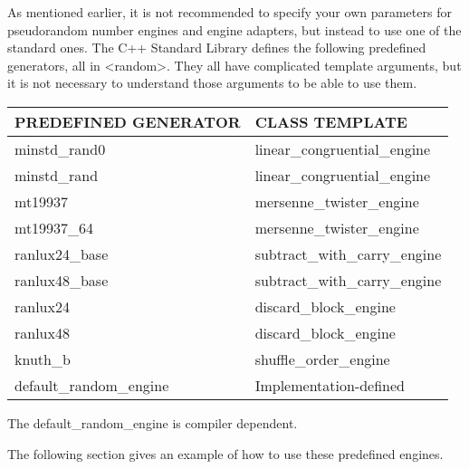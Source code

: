 As mentioned earlier, it is not recommended to specify your own parameters for pseudorandom number engines and engine adapters, but instead to use one of the standard ones. The C++ Standard Library defines the following predefined generators, all in <random>. They all have complicated template arguments, but it is not necessary to understand those arguments to be able to use them.

\begin{longtable}{|l|l|}
\hline
\textbf{PREDEFINED GENERATOR} & \textbf{CLASS TEMPLATE}       \\ \hline
\endfirsthead
%
\endhead
%
minstd\_rand0                 & linear\_congruential\_engine  \\ \hline
minstd\_rand                  & linear\_congruential\_engine  \\ \hline
mt19937                       & mersenne\_twister\_engine     \\ \hline
mt19937\_64                   & mersenne\_twister\_engine     \\ \hline
ranlux24\_base                & subtract\_with\_carry\_engine \\ \hline
ranlux48\_base                & subtract\_with\_carry\_engine \\ \hline
ranlux24                      & discard\_block\_engine        \\ \hline
ranlux48                      & discard\_block\_engine        \\ \hline
knuth\_b                      & shuffle\_order\_engine        \\ \hline
default\_random\_engine       & Implementation-defined        \\ \hline
\end{longtable}

The default\_random\_engine is compiler dependent.

The following section gives an example of how to use these predefined engines.

















